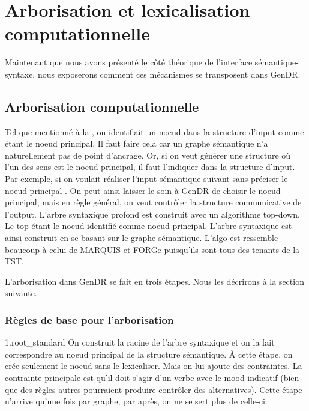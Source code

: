 
\section{Arborisation et lexicalisation computationnelle}\label{secarbolex}

Maintenant que nous avons présenté le côté théorique de l'interface sémantique-syntaxe, nous exposerons comment ces mécanismes se transposent dans GenDR.

\subsection{Arborisation computationnelle}
Tel que mentionné à la , on identifiait un noeud dans la structure d'input comme étant le noeud principal. Il faut faire cela car un graphe sémantique n'a naturellement pas de point d'ancrage. Or, si on veut générer une structure où l'un des sens est le noeud principal, il faut l'indiquer dans la structure d'input. Par exemple, si on voulait réaliser l'input sémantique suivant sans préciser le noeud principal . On peut ainsi laisser le soin à GenDR de choisir le noeud principal, mais en règle général, on veut contrôler la structure communicative de l'output. L'arbre syntaxique profond est construit avec un algorithme top-down. Le top étant le noeud identifié comme noeud principal. L'arbre syntaxique est ainsi construit en se basant sur le graphe sémantique. L'algo est ressemble beaucoup à celui de MARQUIS et FORGe puisqu'ils sont tous des tenants de la TST. 

L'arborisation dans GenDR se fait en trois étapes. Nous les décrirons à la section suivante.

\subsubsection{Règles de base pour l'arborisation}

1.root\_standard On construit la racine de l'arbre syntaxique et on la fait correspondre au noeud principal de la structure sémantique. À cette étape, on crée seulement le noeud sans le lexicaliser. Mais on lui ajoute des contraintes. La contrainte principale est qu'il doit s'agir d'un verbe avec le mood indicatif (bien que des règles autres pourraient produire contrôler des alternatives). Cette étape n'arrive qu'une fois par graphe, par après, on ne se sert plus de celle-ci.

